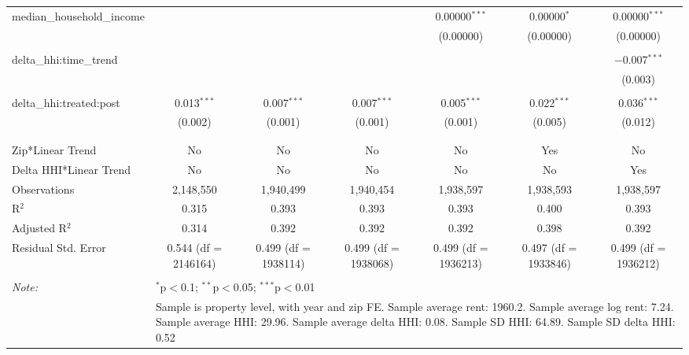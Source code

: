 \begin{table}[H]
{\begin{tabular}{@{\extracolsep{5pt}}lcccccc}
  median\_household\_income &  &  &  & 0.00000$^{***}$ & 0.00000$^{*}$ & 0.00000$^{***}$ \\  

   &  &  &  & (0.00000) & (0.00000) & (0.00000) \\  

   & & & & & & \\  

  delta\_hhi:time\_trend &  &  &  &  &  & $-$0.007$^{***}$ \\  

   &  &  &  &  &  & (0.003) \\  

   & & & & & & \\  

  delta\_hhi:treated:post & 0.013$^{***}$ & 0.007$^{***}$ & 0.007$^{***}$ & 0.005$^{***}$ & 0.022$^{***}$ & 0.036$^{***}$ \\  

   & (0.002) & (0.001) & (0.001) & (0.001) & (0.005) & (0.012) \\  

   & & & & & & \\  

 \hline \\[-1.8ex]  

 Zip*Linear Trend & No & No & No & No & Yes & No \\  

 Delta HHI*Linear Trend & No & No & No & No & No & Yes \\  

 Observations & 2,148,550 & 1,940,499 & 1,940,454 & 1,938,597 & 1,938,593 & 1,938,597 \\  

 R$^{2}$ & 0.315 & 0.393 & 0.393 & 0.393 & 0.400 & 0.393 \\  

 Adjusted R$^{2}$ & 0.314 & 0.392 & 0.392 & 0.392 & 0.398 & 0.392 \\  

 Residual Std. Error & 0.544 (df = 2146164) & 0.499 (df = 1938114) & 0.499 (df = 1938068) & 0.499 (df = 1936213) & 0.497 (df = 1933846) & 0.499 (df = 1936212) \\  

 \hline  

 \hline \\[-1.8ex]  

 \textit{Note:}  & \multicolumn{6}{l}{$^{*}$p$<$0.1; $^{**}$p$<$0.05; $^{***}$p$<$0.01} \\  

  & \multicolumn{6}{l}{Sample is property level, with year and zip FE. Sample average rent: 1960.2. Sample average log rent: 7.24. Sample average HHI: 29.96. Sample average delta HHI: 0.08. Sample SD HHI: 64.89. Sample SD delta HHI: 0.52} \\  

 \end{tabular}}  

 \end{table}  

